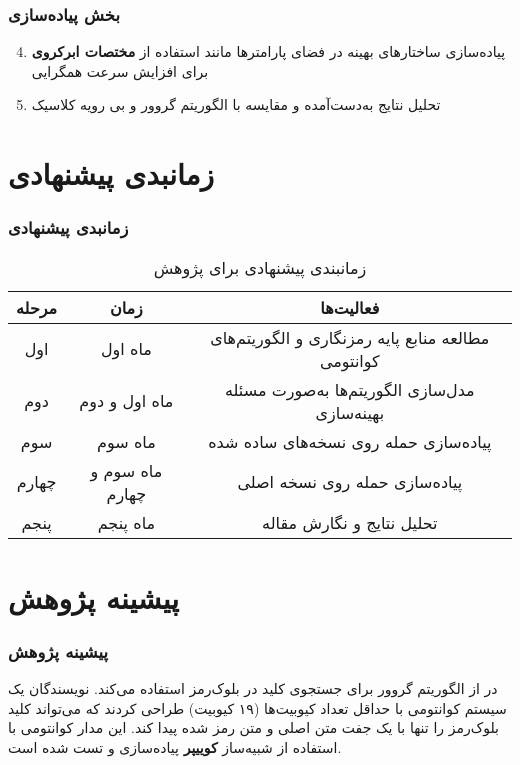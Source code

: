 \documentclass[xcolor=dvipsnames, professionalfonts, aspectratio=169, 11pt]{beamer}
\begin{document}
\begin{frame}
    \frametitle{بخش پیاده‌سازی}
    \begin{enumerate}
        \setcounter{enumi}{3}
        \item پیاده‌سازی ساختارهای بهینه در فضای پارامترها مانند استفاده از \textbf{مختصات ابرکروی} برای افزایش سرعت همگرایی
        \cite{bermejo2024improving}
        \item تحلیل نتایج به‌دست‌آمده و مقایسه با الگوریتم گروور و بی رویه کلاسیک
    \end{enumerate}
\end{frame}

\section{زمانبدی پیشنهادی}
\begin{frame}
    \frametitle{زمانبدی پیشنهادی}
    \begin{table}
        \caption{زمانبندی پیشنهادى براى پژوهش}
        \vspace{-1em}
        \small
        \begin{tabular}{|c|c|c|}
            \hline
            \textbf{مرحله} & \textbf{زمان} & \textbf{فعالیت‌ها} \\
            \hline
            اول & ماه اول & مطالعه منابع پایه رمزنگارى و الگوریتم‌هاى کوانتومى \\
            \hline
            دوم & ماه اول و دوم & مدل‌سازى الگوریتم‌ها به‌صورت مسئله بهینه‌سازى \\
            \hline
            سوم & ماه سوم & پیاده‌سازى حمله روى نسخه‌هاى ساده شده \\
            \hline
            چهارم & ماه سوم و چهارم & پیاده‌سازى حمله روى نسخه اصلى \\
            \hline
            پنجم & ماه پنجم & تحلیل نتایج و نگارش مقاله \\
            \hline
        \end{tabular}
    \end{table}
\end{frame}

\section{پیشینه پژوهش}
\begin{frame}
    \frametitle{پیشینه پژوهش}
    \begin{moredi}
        \item در \cite{denisenko2019application} از الگوریتم گروور برای جستجوی کلید در بلوک‌رمز استفاده می‌کند. نویسندگان یک سیستم کوانتومی با حداقل تعداد کیوبیت‌ها (۱۹ کیوبیت) طراحی کردند که می‌تواند کلید بلوک‌رمز را تنها با یک جفت متن اصلی و متن رمز شده پیدا کند. این مدار کوانتومی با استفاده از شبیه‌ساز \textbf{کوییپر} پیاده‌سازی و تست شده است.     
    \end{moredi}
\end{frame}
\end{document}
